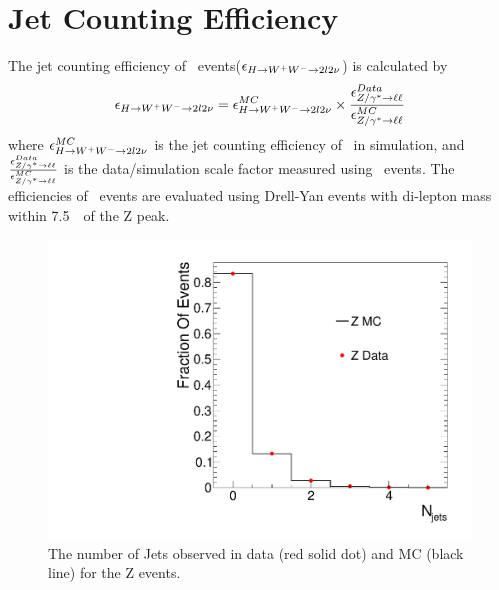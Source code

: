 \newpage
\section{Jet Counting Efficiency} 


The jet counting efficiency of \hww~events($\epsilon_{H\to W^+W^-\to2l2\nu}$) 
is calculated by 
\begin{eqnarray} 
\epsilon_{H\to W^+W^-\to2l2\nu} 
= \epsilon_{H\to W^+W^-\to2l2\nu}^{MC} \times \frac{\epsilon_{Z/\gamma^*\to\ell\ell}^{Data}}{\epsilon_{Z/\gamma^*\to\ell\ell}^{MC}}  
\end{eqnarray} 
where $\epsilon_{H\to W^+W^-\to2l2\nu}^{MC}$ is the jet counting efficiency of \hww~in simulation, 
and $\frac{\epsilon_{Z/\gamma^*\to\ell\ell}^{Data}}{\epsilon_{Z/\gamma^*\to\ell\ell}^{MC}}$
is the data/simulation scale factor measured using \dyll~events.
The efficiencies of \dyll~events are evaluated using Drell-Yan events with  
di-lepton mass within 7.5~\GeV\ of the Z peak. 
\begin{figure}[!hbtp]
\centering
\includegraphics[width=.7\textwidth]{figures/Znjets.pdf}
\caption{The number of Jets observed in data (red solid dot) and MC (black line) for the Z events. }
\label{fig:znjets}
\end{figure}

